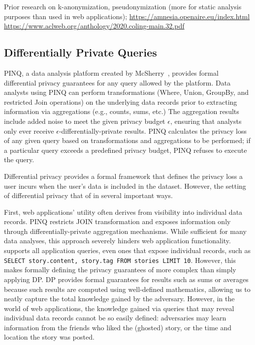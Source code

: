 Prior research on k-anonymization, pseudonymization (more for static analysis purposes than used in
web applications);
\url{https://amnesia.openaire.eu/index.html}
\url{https://www.aclweb.org/anthology/2020.coling-main.32.pdf}

\subsection{Differentially Private Queries}

PINQ, a data analysis platform created by McSherry~\cite{pinq}, provides formal differential privacy
guarantees for any query allowed by the platform.  Data analysts using PINQ can perform
transformations (Where, Union, GroupBy, and restricted Join operations) on the underlying data
records prior to extracting information via aggregations (e.g., counts, sums, etc.) The aggregation
results include added noise to meet the given privacy budget $\epsilon$, ensuring that analysts only
ever receive $\epsilon$-differentially-private results.  PINQ calculates the privacy loss of any
given query based on transformations and aggregations to be performed; if a particular query exceeds
a predefined privacy budget, PINQ refuses to execute the query.

Differential privacy provides a formal framework that defines the privacy loss a user incurs
when the user's data is included in the dataset. However, the setting of differential privacy
that of \sys{} in several important ways. 

First, web applications' utility often derives from visibility into individual data records. PINQ
restricts JOIN transformation and exposes information only through differentially-private
aggregation mechanisms. While sufficient for many data analyses, this approach severely hinders web
application functionality. \sys{} supports all application queries, even ones that expose individual
records, such as \texttt{SELECT story.content, story.tag FROM stories LIMIT 10}.  
However, this makes formally defining the privacy guarantees of \sys{} more complex than
simply applying DP.  DP provides formal guarantees for results such as sums or averages because such
results are computed using well-defined mathematics, allowing us to neatly capture the total
knowledge gained by the adversary. However, in the world of web applications, the knowledge gained
via queries that may reveal individual data records cannot be so easily defined: adversaries may
learn information from the friends who liked the (ghosted) story, or the time and location the story
was posted.

